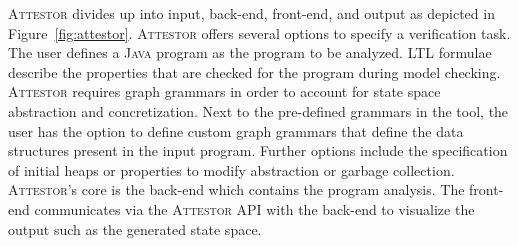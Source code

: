 \documentclass[a4paper, 12pt, twoside]{report}
\begin{document}
	\textsc{Attestor} divides up into input, back-end, front-end, and output as depicted in Figure~\ref{fig:attestor}. \textsc{Attestor} offers several options to specify a verification task. The user defines a \textsc{Java} program as the program to be analyzed. LTL formulae describe the properties that are checked for the program during model checking. \textsc{Attestor} requires graph grammars in order to account for state space abstraction and concretization. Next to the pre-defined grammars in the tool, the user has the option to define custom graph grammars that define the data structures present in the input program. Further options include the specification of initial heaps or properties to modify abstraction or garbage collection. \textsc{Attestor}'s core is the back-end which contains the program analysis. The front-end communicates via the \textsc{Attestor} API with the back-end to visualize the output such as the generated state space.\\	
	
\end{document}

